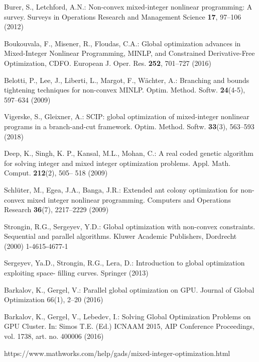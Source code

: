 \documentclass{llncs}
\begin{document}
\begin{thebibliography}{10}

Burer, S., Letchford, A.N.: Non-convex mixed-integer nonlinear programming: A survey. 
Surveys in Operations Research and Management Science \textbf{17}, 97--106 (2012) 

Boukouvala, F., Misener, R., Floudas, C.A.: Global optimization advances in Mixed-Integer 
Nonlinear Programming, MINLP, and Constrained Derivative-Free Optimization, CDFO. 
European J. Oper. Res. \textbf{252}, 701--727 (2016) 

Belotti, P., Lee, J., Liberti, L., Margot, F., W\"achter, A.: Branching and bounds tightening 
techniques for non-convex MINLP. Optim. Method. Softw. \textbf{24}(4-5), 597--634 (2009)

Vigerske, S., Gleixner, A.: SCIP: global optimization of mixed-integer nonlinear programs in a 
branch-and-cut framework. 
Optim. Method. Softw. \textbf{33}(3), 563--593 (2018)

Deep, K., Singh, K. P., Kansal, M.L., Mohan, C.: A real coded genetic algorithm for solving 
integer and mixed integer optimization problems. Appl. Math. Comput. \textbf{212}(2), 505--
518 (2009)

Schl\"uter, M., Egea, J.A., Banga, J.R.: Extended ant colony optimization for non-convex 
mixed integer nonlinear programming. Computers and Operations Research \textbf{36}(7), 
2217--2229 (2009)

Strongin, R.G., Sergeyev, Y.D.: Global optimization with non-convex constraints. Sequential 
and parallel algorithms. Kluwer Academic Publishers, Dordrecht (2000) %
1-4615-4677-1

Sergeyev, Ya.D., Strongin, R.G., Lera, D.: Introduction to global optimization exploiting space-
filling curves. Springer (2013) %

Barkalov, K., Gergel, V.: Parallel global optimization on GPU. Journal of Global Optimization 
66(1), 2--20 (2016) 

Barkalov, K., Gergel, V., Lebedev, I.: Solving Global Optimization Problems on GPU Cluster. 
In: Simos T.E. (Ed.) ICNAAM 2015, AIP Conference Proceedings, vol. 1738, art. no. 400006 
(2016)

https://www.mathworks.com/help/gads/mixed-integer-optimization.html


\end{thebibliography}
\end{document}
